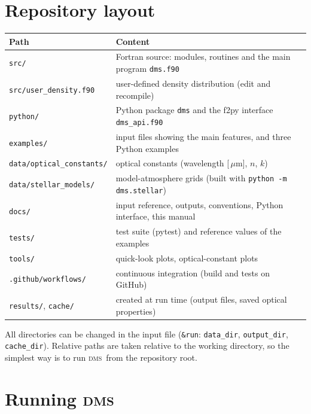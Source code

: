 \documentclass[11pt,a4paper]{article}
\newcommand{\dms}{\textsc{dms}}
\newcommand{\code}[1]{\texttt{#1}}
\newcommand{\um}{\,$\mu$m}
\begin{document}
\section{Repository layout}
\label{sec:layout}

\begin{center}
\small
\begin{tabularx}{\textwidth}{@{}lX@{}}
\toprule
Path & Content \\
\midrule
\code{src/} & Fortran source: modules, routines and the main program \code{dms.f90} \\
\code{src/user\_density.f90} & user-defined density distribution (edit and recompile) \\
\code{python/} & Python package \code{dms} and the f2py interface \code{dms\_api.f90} \\
\code{examples/} & input files showing the main features, and three Python examples \\
\code{data/optical\_constants/} & optical constants (wavelength [\um], $n$, $k$) \\
\code{data/stellar\_models/} & model-atmosphere grids (built with \code{python -m dms.stellar}) \\
\code{docs/} & input reference, outputs, conventions, Python interface, this manual \\
\code{tests/} & test suite (pytest) and reference values of the examples \\
\code{tools/} & quick-look plots, optical-constant plots \\
\code{.github/workflows/} & continuous integration (build and tests on GitHub) \\
\code{results/}, \code{cache/} & created at run time (output files, saved optical properties) \\
\bottomrule
\end{tabularx}
\end{center}

All directories can be changed in the input file (\code{\&run}: \code{data\_dir},
\code{output\_dir}, \code{cache\_dir}). Relative paths are taken relative to the working
directory, so the simplest way is to run \dms\ from the repository root.

\section{Running \dms}
\label{sec:run}
\end{document}
